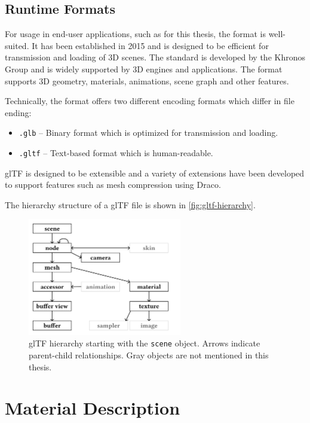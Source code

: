 \subsection{Runtime Formats}

For usage in end-user applications, such as for this thesis, the  format is well-suited. It has been established in 2015 and is designed to be efficient for transmission and loading of 3D scenes. The standard is developed by the Khronos Group and is widely supported by 3D engines and applications. The format supports 3D geometry, materials, animations, scene graph and other features.

Technically, the format offers two different encoding formats which differ in file ending:

\begin{itemize}
    \item{\texttt{.glb}} – Binary format which is optimized for transmission and loading.
    \item{\texttt{.gltf}} – Text-based format which is human-readable.
\end{itemize}

glTF is designed to be extensible and a variety of extensions have been developed to support features such as mesh compression using Draco.

The hierarchy structure of a glTF file is shown in \autoref{fig:gltf-hierarchy}.

\begin{figure}[H]
  \centering
  \includegraphics[width=0.6\textwidth]{resources/gltf-hierarchy.png}
  \caption{glTF hierarchy starting with the \texttt{scene} object. Arrows indicate parent-child relationships. Gray objects are not mentioned in this thesis.}
  \label{fig:gltf-hierarchy}
\end{figure}

\section{Material Description}


